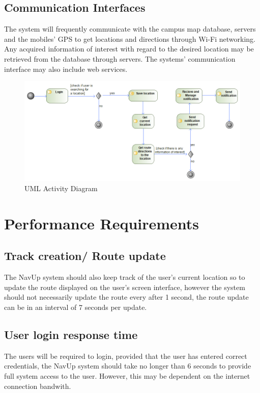 	\subsection{Communication Interfaces}
The system will frequently communicate with the campus map database, servers and the mobiles’ GPS to get locations and directions through Wi-Fi networking. Any acquired information of interest with regard to the desired location may be retrieved from the database through servers. The systems’ communication interface may also include web services.
	
	\begin{figure}[H]\includegraphics[width=\textwidth]{ActivityDiagram}
	\caption{UML Activity Diagram}
	\end{figure}
	
\section{Performance Requirements}
	\subsection{Track creation/ Route update}
	The NavUp system should also keep track of the user's current location
	so to update the route displayed on the user's screen interface, however 
	the system should not necessarily update the route every after 1 second, the 
	route update can be in an interval of 7 seconds per update.
	\subsection{User login response time}
	The users will be required to login, provided that the user has
	entered correct credentials, the NavUp system should take no longer
	than 6 seconds to provide full system access to the user. However, this
	may be dependent on the internet connection bandwith.

